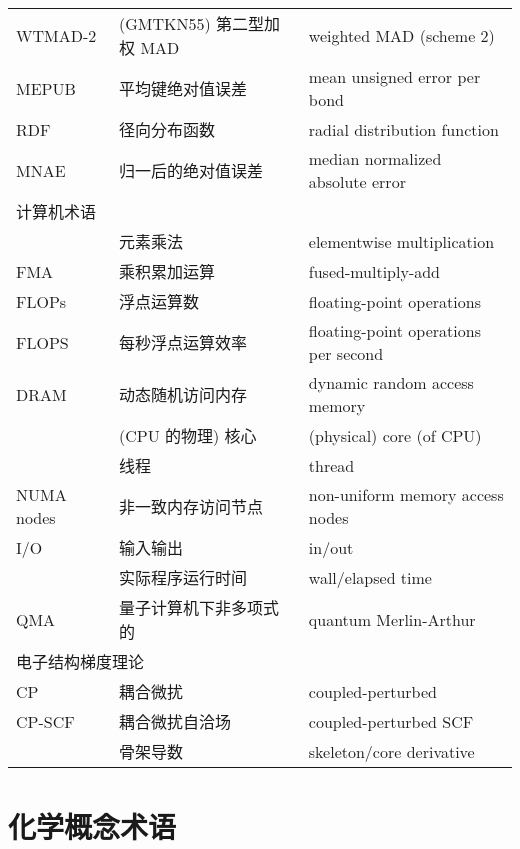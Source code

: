 \begin{longtable}{lll}
    WTMAD-2 & (GMTKN55) 第二型加权 MAD & weighted MAD (scheme 2) \\
    MEPUB & 平均键绝对值误差 & mean unsigned error per bond \\
    RDF & 径向分布函数 & radial distribution function \\
    MNAE & 归一后的绝对值误差 & median normalized absolute error \\
    \midrule
    \multicolumn{3}{l}{\textsf{计算机术语}} \\
    & 元素乘法 & elementwise multiplication \\
    FMA & 乘积累加运算 & fused-multiply-add \\
    FLOPs & 浮点运算数 & floating-point operations \\
    FLOPS & 每秒浮点运算效率 & floating-point operations per second \\
    DRAM & 动态随机访问内存 & dynamic random access memory \\
    & (CPU 的物理) 核心 & (physical) core (of CPU) \\
    & 线程 & thread \\
    NUMA nodes & 非一致内存访问节点 & non-uniform memory access nodes \\
    I/O & 输入输出 & in/out \\
    & 实际程序运行时间 & wall/elapsed time \\
    QMA & 量子计算机下非多项式的 & quantum Merlin-Arthur \\
    \midrule
    \multicolumn{3}{l}{\textsf{电子结构梯度理论}} \\
    CP & 耦合微扰 & coupled-perturbed \\
    CP-SCF & 耦合微扰自洽场 & coupled-perturbed SCF \\
    & 骨架导数 & skeleton/core derivative \\
\end{longtable}

\endgroup
    
\section*{化学概念术语}

\begingroup
\setlength{\LTleft}{-20cm plus -1fill}
\setlength{\LTright}{\LTleft}

